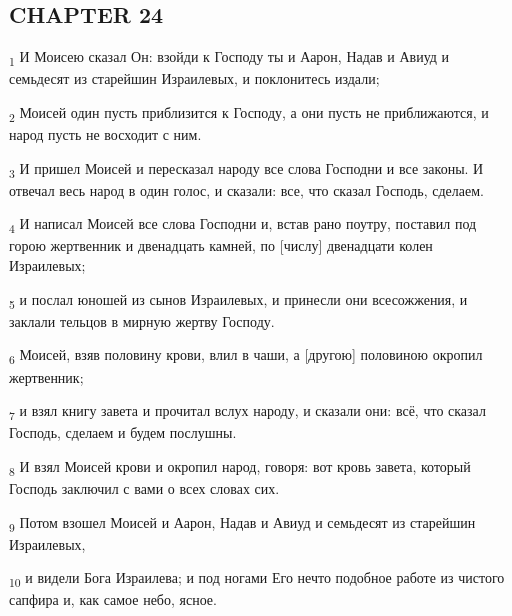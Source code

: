 \subsection{CHAPTER 24}
\begin{tcolorbox}
\textsubscript{1} И Моисею сказал Он: взойди к Господу ты и Аарон, Надав и Авиуд и семьдесят из старейшин Израилевых, и поклонитесь издали;
\end{tcolorbox}
\begin{tcolorbox}
\textsubscript{2} Моисей один пусть приблизится к Господу, а они пусть не приближаются, и народ пусть не восходит с ним.
\end{tcolorbox}
\begin{tcolorbox}
\textsubscript{3} И пришел Моисей и пересказал народу все слова Господни и все законы. И отвечал весь народ в один голос, и сказали: все, что сказал Господь, сделаем.
\end{tcolorbox}
\begin{tcolorbox}
\textsubscript{4} И написал Моисей все слова Господни и, встав рано поутру, поставил под горою жертвенник и двенадцать камней, по [числу] двенадцати колен Израилевых;
\end{tcolorbox}
\begin{tcolorbox}
\textsubscript{5} и послал юношей из сынов Израилевых, и принесли они всесожжения, и заклали тельцов в мирную жертву Господу.
\end{tcolorbox}
\begin{tcolorbox}
\textsubscript{6} Моисей, взяв половину крови, влил в чаши, а [другою] половиною окропил жертвенник;
\end{tcolorbox}
\begin{tcolorbox}
\textsubscript{7} и взял книгу завета и прочитал вслух народу, и сказали они: всё, что сказал Господь, сделаем и будем послушны.
\end{tcolorbox}
\begin{tcolorbox}
\textsubscript{8} И взял Моисей крови и окропил народ, говоря: вот кровь завета, который Господь заключил с вами о всех словах сих.
\end{tcolorbox}
\begin{tcolorbox}
\textsubscript{9} Потом взошел Моисей и Аарон, Надав и Авиуд и семьдесят из старейшин Израилевых,
\end{tcolorbox}
\begin{tcolorbox}
\textsubscript{10} и видели Бога Израилева; и под ногами Его нечто подобное работе из чистого сапфира и, как самое небо, ясное.
\end{tcolorbox}
